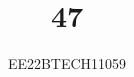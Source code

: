 \documentclass[journal,12pt,twocolumn]{IEEEtran}
\theoremstyle{remark}
\begin{document}
%




\vspace{3cm}

\title{
	47
}
\author{ EE22BTECH11059%
}	


%
%
%

% 
%



% 
\end{document}
